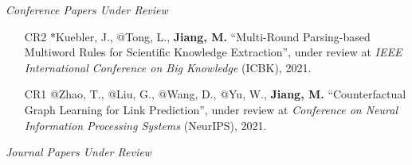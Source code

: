 \documentclass[10pt]{article}
\newenvironment{myindentpar}[1]%
{\begin{list}{}%
         {\setlength{\leftmargin}{#1}}%
         \item[]%
}
{\end{list}}
\newcounter{list}
\begin{document}
\begin{myindentpar}{0.00cm}

\vspace{.2cm}\hspace{-0.25cm}\textit{Conference Papers Under Review}

\begin{enumerate}[leftmargin=.5cm]


		



\item[CR2] *Kuebler, J., @Tong, L., \textbf{Jiang, M.} ``Multi-Round Parsing-based Multiword Rules for Scientific Knowledge Extraction'', under review at \textit{IEEE International Conference on Big Knowledge} (ICBK), 2021.

\item[CR1] @Zhao, T., @Liu, G., @Wang, D., @Yu, W., \textbf{Jiang, M.} ``Counterfactual Graph Learning for Link Prediction'', under review at \textit{Conference on Neural Information Processing Systems} (NeurIPS), 2021.

\end{enumerate}

\vspace{.2cm}\hspace{-0.25cm}\textit{Journal Papers Under Review}


\end{myindentpar}
\end{document}
